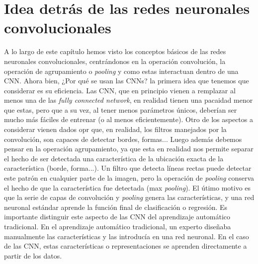 \section{Idea detrás de las redes neuronales convolucionales}

A lo largo de este capítulo hemos visto los conceptos básicos de las redes neuronales convolucionales, centrándonos en la operación convolución, la operación de agrupamiento o \textit{pooling} y como estas interactuan dentro de una CNN. Ahora bien, ¿Por qué se usan las CNNs? la primera idea que tenemos que considerar es su eficiencia. Las CNN, que en principio vienen a remplazar al menos una de las \textit{fully connected network}, en realidad tienen una pacaidad menor que estas, pero que a su vez, al tener menos parámetros únicos, deberían ser mucho más fáciles de entrenar (o al menos eficientemente). Otro de los aspectos a considerar vienen dados opr que, en realidad, los filtros manejados por la convolución, son capaces de detectar bordes, formas... Luego además debemos pensar en la operación agrupamiento, ya que esta en realidad nos permite separar el hecho de ser detectada una característica de la ubicación exacta de la característica (borde, forma...). Un filtro que detecta líneas rectas puede detectar este patrón en cualquier parte de la imagen, pero la operación de \textit{pooling} conserva el hecho de que la característica fue detectada (max \textit{pooling}). El útimo motivo es que la serie de capas de convolución y \textit{pooling} genera las características, y una red neuronal estándar aprende la función final de clasificación o regresión. Es importante distinguir este aspecto de las CNN del aprendizaje automático tradicional. En el aprendizaje automático tradicional, un experto diseñaba manualmente las características y las introducía en una red neuronal. En el caso de las CNN, estas características o representaciones se aprenden directamente a partir de los datos.